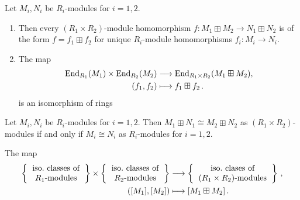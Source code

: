 \begin{corollary}
  \label{label: endomorphism ring of boxsum}
  Let $M_i, N_i$ be $R_i$-modules for $i = 1, 2$.
  \begin{enumerate}
    \item
      Then every $(R_1 \times R_2)$-module homomorphism $f \colon M_1 \boxplus M_2 \to N_1 \boxplus N_2$ is of the form $f = f_1 \boxplus f_2$ for unique $R_i$-module homomorphisms $f_i \colon M_i \to N_i$.
    \item
      The map
      \begin{align*}
                  \operatorname{End}_{R_1}(M_1) \times \operatorname{End}_{R_2}(M_2)
        &\longrightarrow  \operatorname{End}_{R_1 \times R_2}(M_1 \boxplus M_2),
        \\
                      (f_1, f_2)
        &\longmapsto  f_1 \boxplus f_2 \,.
      \end{align*}
      is an isomorphism of rings
  \end{enumerate}
\end{corollary}


\begin{corollary}
  Let $M_i, N_i$ be $R_i$-modules for $i = 1, 2$.
  Then $M_1 \boxplus N_1 \cong M_2 \boxplus N_2$ as $(R_1 \times R_2)$-modules if and only if $M_i \cong N_i$ as $R_i$-modules for $i = 1, 2$.
\end{corollary}


\begin{corollary}
  \label{corollary: isomorphism classes of modules over products}
  The map
  \begin{align*}
    \left\{
      \begin{tabular}{c}
        iso.\ classes of  \\
        $R_1$-modules
      \end{tabular}
    \right\}
    \times
    \left\{
      \begin{tabular}{c}
        iso.\ classes of  \\
        $R_2$-modules
      \end{tabular}
    \right\}
    &\longto
    \left\{
      \begin{tabular}{c}
        iso.\ clases of \\
        $(R_1 \times R_2)$-modules
      \end{tabular}
    \right\} \,,
    \\
    ( [M_1], [M_2] )
    &\longmapsto
    [M_1 \boxplus M_2] \,.
  \end{align*}
\end{corollary}





